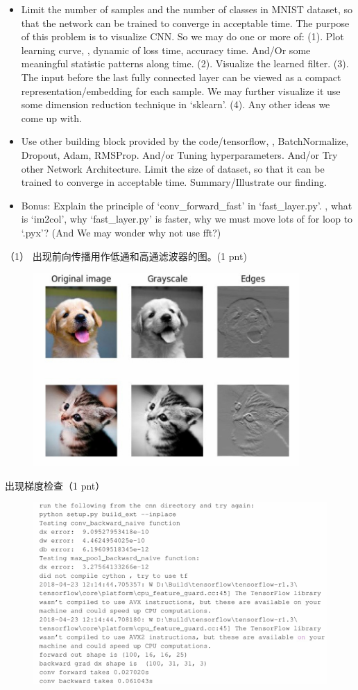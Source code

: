 \documentclass[12pt]{article}
\begin{document}
\begin{itemize}
	\item Limit the number of samples and the number of classes in MNIST dataset, so that the network can be trained to converge in acceptable time. The purpose of this problem is to visualize CNN. So we may do one or more of: (1). Plot learning curve, \ie, dynamic of loss \wrt time, accuracy \wrt time. And/Or some meaningful statistic patterns along time. (2). Visualize the learned filter. (3). The input before the last fully connected layer can be viewed as a compact representation/embedding for each sample. We may further visualize it use some dimension reduction technique in `sklearn'. (4). Any other ideas we come up with. 
	\item Use other building block provided by the code/tensorflow, \eg, BatchNormalize, Dropout, Adam, RMSProp. And/or Tuning  hyperparameters. And/or Try other Network Architecture. Limit the size of dataset, so that it can be trained to converge in acceptable time. Summary/Illustrate our finding.  
	\item Bonus: Explain the principle of `conv\_forward\_fast' in `fast\_layer.py'. \eg, what is `im2col', why `fast\_layer.py' is faster, why we must move lots of for loop to `.pyx'? (And We may wonder why not use fft?)
\end{itemize}

（1） 出现前向传播用作低通和高通滤波器的图。(1 pnt)

\begin{figure}[h]
	\includegraphics[width=.7\textwidth]{fig/2018-05-03-21-17-51.png}
\end{figure}

出现梯度检查（1 pnt） 

\begin{figure}[h]
	\includegraphics[width=.65\textwidth]{fig/2018-05-03-21-19-49.png}
\end{figure}
\end{document}
